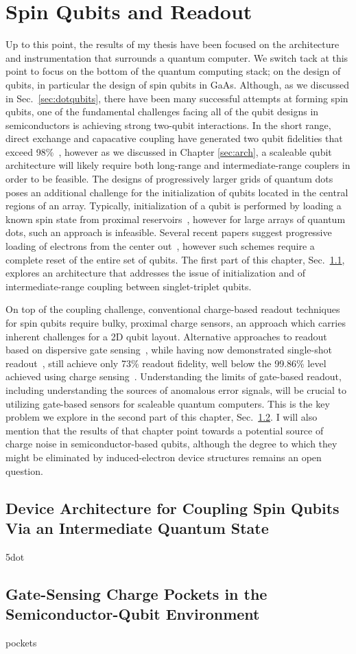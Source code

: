 \chapter{Spin Qubits and Readout}
\label{sec:spinqubit}

Up to this point, the results of my thesis have been focused on the architecture and instrumentation that surrounds a quantum
computer. We switch tack at this point to focus on the bottom of the quantum computing stack; on the design of qubits, in
particular the design of spin qubits in GaAs. Although, as we discussed in Sec.~\ref{sec:dotqubits}, there have been many
successful attempts at forming spin qubits, one of the fundamental challenges facing all of the qubit designs in semiconductors
is achieving strong two-qubit interactions. In the short range, direct exchange and capacative coupling have generated two qubit
fidelities that exceed 98\%~\cite{PhysRevA.99.042310}, however as we discussed in Chapter \ref{sec:arch}, a scaleable qubit architecture
will likely require both long-range and intermediate-range couplers in order to be feasible. The designs of progressively
larger grids of quantum dots poses an additional challenge for the initialization of qubits located in the central regions
of an array. Typically, initialization of a qubit is performed by loading a known spin state from proximal reservoirs~\cite{petta}, however
for large arrays of quantum dots, such an approach is infeasible. Several recent papers suggest progressive loading of electrons
from the center out~\cite{PhysRevApplied.6.054013,qubyte}, however such schemes require a complete reset of the entire set of qubits.
The first part of this chapter, Sec.~\ref{sec:5dot}, explores an architecture that addresses the issue of initialization and of
intermediate-range coupling between singlet-triplet qubits.

On top of the coupling challenge, conventional charge-based readout techniques for spin qubits require bulky, proximal charge sensors, an
approach which carries inherent challenges for a 2D qubit layout. Alternative approaches to readout based on dispersive gate
sensing~\cite{PhysRevLett.110.046805}, while having now demonstrated single-shot readout~\cite{Nnano_dzurak}, still achieve only 73\% readout
fidelity, well below the 99.86\% level achieved using charge sensing~\cite{Keith_2019,PhysRevX.8.021046}. Understanding the limits of gate-based
readout, including understanding the sources of anomalous error signals, will be crucial to utilizing gate-based sensors for scaleable quantum
computers. This is the key problem we explore in the second part of this chapter, Sec.~\ref{sec:pockets}. I will also mention that the results
of that chapter point towards a potential source of charge noise in semiconductor-based qubits, although the degree to which they might
be eliminated by induced-electron device structures remains an open question.

\clearpage
\section{Device Architecture for Coupling Spin Qubits Via an Intermediate Quantum State}
\label{sec:5dot}
{5dot}

\clearpage
\section{Gate-Sensing Charge Pockets in the Semiconductor-Qubit Environment}
\label{sec:pockets}
{pockets}